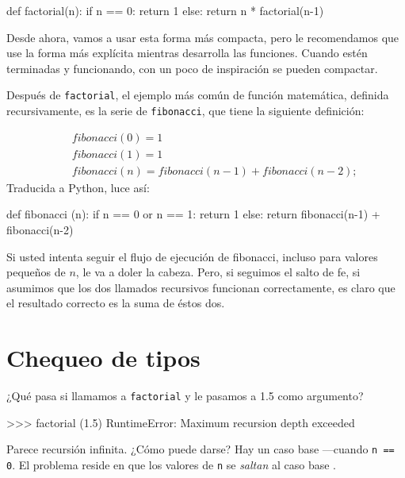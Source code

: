 \beforeverb
\begin{pythoncode}
def factorial(n):
  if n == 0:
    return 1
  else:
    return n * factorial(n-1)
\end{pythoncode}
\afterverb
%
Desde ahora, vamos a usar esta forma más compacta, pero le recomendamos
que use la forma más explícita mientras desarrolla las funciones.
Cuando estén terminadas y funcionando, con un poco de inspiración se pueden compactar.


Después de  \texttt{factorial}, el ejemplo más común de  función
matemática, definida recursivamente, es la serie de  \texttt{fibonacci}, que
tiene la siguiente definición:

\vspace{-0.25in}
\begin{eqnarray*}
&& fibonacci(0) = 1 \\
&& fibonacci(1) = 1 \\
&& fibonacci(n) = fibonacci(n-1) + fibonacci(n-2);
\end{eqnarray*}
%
Traducida a Python, luce así:

\beforeverb
\begin{pythoncode}
def fibonacci (n):
  if n == 0 or n == 1:
    return 1
  else:
    return fibonacci(n-1) + fibonacci(n-2)
\end{pythoncode}
\afterverb
%
Si usted intenta seguir el flujo de ejecución de fibonacci, incluso
para valores pequeños de  $n$, le va a doler la cabeza. 
Pero, si seguimos el salto de fe, si asumimos que los dos
llamados recursivos funcionan correctamente, es claro que
el resultado correcto es la suma de éstos dos.


\section{Chequeo de tipos}

¿Qué pasa si llamamos a \texttt{factorial} y le pasamos a 1.5 como argumento?

\beforeverb
\begin{pyconcode}
>>> factorial (1.5)
RuntimeError: Maximum recursion depth exceeded
\end{pyconcode}
\afterverb
%

Parece recursión  infinita. ¿Cómo puede darse?  Hay un caso 
base ---cuando \texttt{n == 0}.  El problema reside en que
los valores de \texttt{n} se {\em saltan} al caso base .

